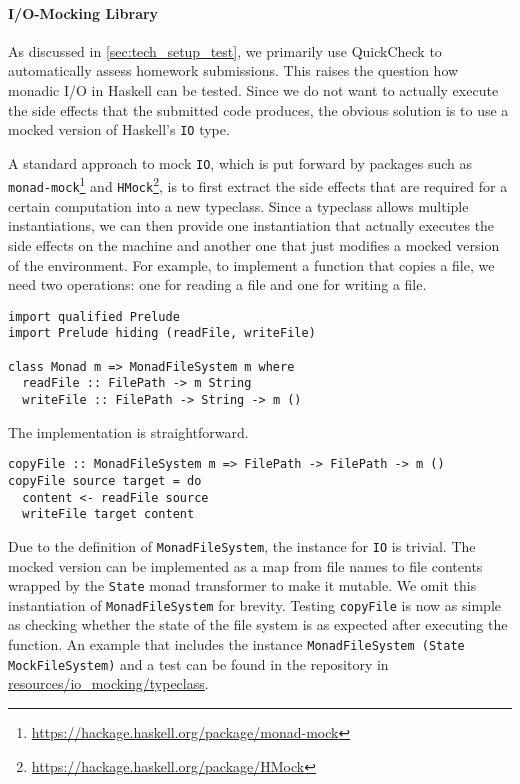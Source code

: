 \paragraph{I/O-Mocking Library}
As discussed in \cref{sec:tech_setup_test}, we primarily use QuickCheck to automatically assess homework submissions.
This raises the question how monadic I/O in Haskell can be tested.
Since we do not want to actually execute the side effects that the submitted code produces,
the obvious solution is to use a mocked version of Haskell's \texttt{IO} type.

A standard approach to mock \texttt{IO}, which is put forward by packages such as \texttt{monad-mock}\footnote{\url{https://hackage.haskell.org/package/monad-mock}} and \texttt{HMock}\footnote{\url{https://hackage.haskell.org/package/HMock}}, is to first extract the side effects that are required for a certain computation into a new typeclass.
Since a typeclass allows multiple instantiations,
we can then provide one instantiation that actually executes the side effects on the machine
and another one that just modifies a mocked version of the environment.
For example, to implement a function that copies a file,
we need two operations:
one for reading a file and one for writing a file.
\begin{verbatim}
import qualified Prelude
import Prelude hiding (readFile, writeFile)

class Monad m => MonadFileSystem m where
  readFile :: FilePath -> m String
  writeFile :: FilePath -> String -> m ()
\end{verbatim}
The implementation is straightforward.
\begin{verbatim}
copyFile :: MonadFileSystem m => FilePath -> FilePath -> m ()
copyFile source target = do
  content <- readFile source
  writeFile target content
\end{verbatim}
Due to the definition of \texttt{MonadFileSystem}, the instance for \texttt{IO} is trivial.
The mocked version can be implemented as a map from file names to file contents wrapped by the \texttt{State} monad transformer to make it mutable.
We omit this instantiation of \texttt{MonadFileSystem} for brevity.
Testing \texttt{copyFile} is now as simple as checking whether the state of the file system is as expected after executing the function.
An example that includes the instance \texttt{MonadFileSystem (State MockFileSystem)} and a test can be found in the repository in \href{https://github.com/kappelmann/engaging-large-scale-functional-programming/tree/main/resources/io_mocking/typeclass}{resources/io\_mocking/typeclass}.
